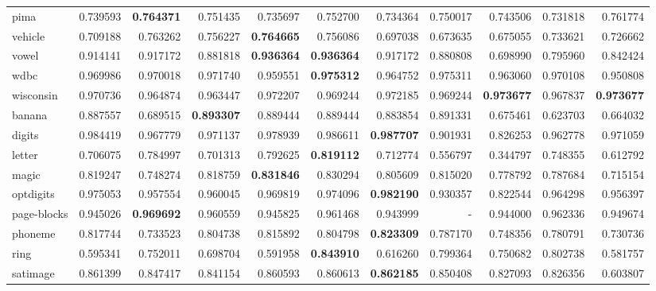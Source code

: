 \begin{tabular}{lrrrrrrrrrr}
pima            &   0.739593 &  \textbf{0.764371} &  0.751435 &  0.735697 &  0.752700 &  0.734364 &  0.750017 &  0.743506 &  0.731818 &  0.761774 \\
vehicle         &   0.709188 &  0.763262 &  0.756227 &  \textbf{0.764665} &  0.756086 &  0.697038 &  0.673635 &  0.675055 &  0.733621 &  0.726662 \\
vowel           &   0.914141 &  0.917172 &  0.881818 &  \textbf{0.936364} &  \textbf{0.936364} &  0.917172 &  0.880808 &  0.698990 &  0.795960 &  0.842424 \\
wdbc            &   0.969986 &  0.970018 &  0.971740 &  0.959551 &  \textbf{0.975312} &  0.964752 &  0.975311 &  0.963060 &  0.970108 &  0.950808 \\
wisconsin       &   0.970736 &  0.964874 &  0.963447 &  0.972207 &  0.969244 &  0.972185 &  0.969244 &  \textbf{0.973677} &  0.967837 &  \textbf{0.973677} \\
banana          &   0.887557 &  0.689515 &  \textbf{0.893307} &  0.889444 &  0.889444 &  0.883854 &  0.891331 &  0.675461 &  0.623703 &  0.664032 \\
digits          &   0.984419 &  0.967779 &  0.971137 &  0.978939 &  0.986611 &  \textbf{0.987707} &  0.901931 &  0.826253 &  0.962778 &  0.971059 \\
letter          &   0.706075 &  0.784997 &  0.701313 &  0.792625 &  \textbf{0.819112} &  0.712774 &  0.556797 &  0.344797 &  0.748355 &  0.612792 \\
magic           &   0.819247 &  0.748274 &  0.818759 &  \textbf{0.831846} &  0.830294 &  0.805609 &  0.815020 &  0.778792 &  0.787684 &  0.715154 \\
optdigits       &   0.975053 &  0.957554 &  0.960045 &  0.969819 &  0.974096 &  \textbf{0.982190} &  0.930357 &  0.822544 &  0.964298 &  0.956397 \\
page-blocks     &   0.945026 &  \textbf{0.969692} &  0.960559 &  0.945825 &  0.961468 &  0.943999 &       - &  0.944000 &  0.962336 &  0.949674 \\
phoneme         &   0.817744 &  0.733523 &  0.804738 &  0.815892 &  0.804798 &  \textbf{0.823309} &  0.787170 &  0.748356 &  0.780791 &  0.730736 \\
ring            &   0.595341 &  0.752011 &  0.698704 &  0.591958 &  \textbf{0.843910} &  0.616260 &  0.799364 &  0.750682 &  0.802738 &  0.581757 \\
satimage        &   0.861399 &  0.847417 &  0.841154 &  0.860593 &  0.860613 &  \textbf{0.862185} &  0.850408 &  0.827093 &  0.826356 &  0.603807 \\

\end{tabular}
